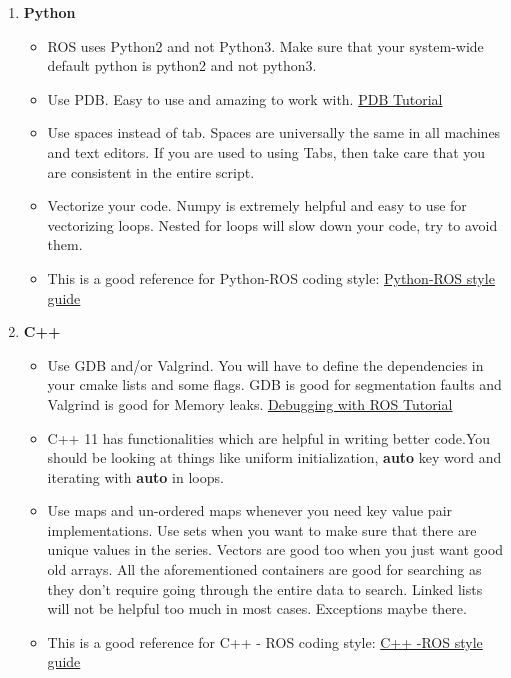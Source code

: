 \documentclass[letta4 paper]{article}
\begin{document}
\begin{enumerate}
\begin{enumerate}
\begin{itemize}
        \end{itemize}
        \item \textbf{Python}
        \begin{itemize}
            \item ROS uses Python2 and not Python3. Make sure that your system-wide default python is python2 and not python3. 
            \item Use PDB. Easy to use and amazing to work with. \href{https://realpython.com/python-debugging-pdb/}{PDB Tutorial}\\
            \item Use spaces instead of tab. Spaces are universally the same in all machines and text editors. If you are used to using Tabs, then take care that you are consistent in the entire script. 
            \item Vectorize your code. Numpy is extremely helpful and easy to use for vectorizing loops. Nested for loops will slow down your code, try to avoid them.
            \item This is a good reference for Python-ROS coding style:
            \href{http://wiki.ros.org/PyStyleGuide}{Python-ROS style guide}
        \end{itemize}{}
        \item \textbf{C++}
        \begin{itemize}
            \item Use GDB and/or Valgrind. You will have to define the dependencies in your cmake lists and some flags. GDB is good for segmentation faults and Valgrind is good for Memory leaks.
            \href{http://wiki.ros.org/roslaunch/Tutorials/Roslaunch%20Nodes%20in%20Valgrind%20or%20GDB}{Debugging with ROS Tutorial}
            \item C++ 11 has functionalities which are helpful in writing better code.You should be looking at things like uniform initialization, \textbf{auto} key word and iterating with \textbf{auto} in loops. 
            \item Use maps and un-ordered maps whenever you need key value pair implementations. Use sets when you want to make sure that there are unique values in the series. Vectors are good too when you just want good old arrays. All the aforementioned containers are good for searching as they don't require going through the entire data to search. Linked lists will not be helpful too much in most cases. Exceptions maybe there.
            \item This is a good reference for C++ - ROS coding style: \href{http://wiki.ros.org/CppStyleGuide}{C++ -ROS style guide}
        \end{itemize}{}
    \end{enumerate}{}
    
    
\end{enumerate}
\end{document}
